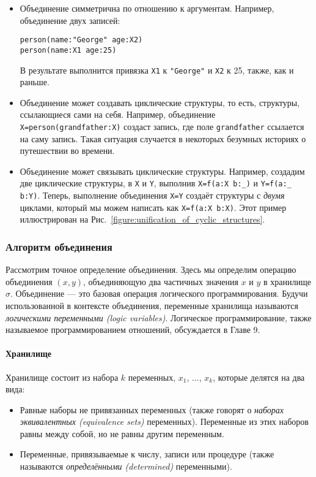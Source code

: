 \begin{itemize}
\item{Объединение симметрична по отношению к аргументам. Например, объединение двух записей:

  \begin{lstlisting}
person(name:"George" age:X2)
person(name:X1 age:25)
  \end{lstlisting}
  
В результате выполнится привязка \lstinline!X1! к \lstinline!"George"! и \lstinline!X2! к 25, также, как и раньше.}

\item{Объединение может создавать циклические структуры, то есть, структуры, ссылающиеся сами на себя. Например, объединение \lstinline!X=person(grandfather:X)! создаст запись, где поле \lstinline!grandfather! ссылается на саму запись. Такая ситуация случается в некоторых безумных историях о путешествии во времени.}

\item{Объединение может связывать циклические структуры. Например, создадим две циклические структуры, в \lstinline!X! и \lstinline!Y!, выполнив \lstinline!X=f(a:X b:_)! и \lstinline!Y=f(a:_ b:Y)!. Теперь, выполнение объединения \lstinline!X=Y! создаёт структуры с \emph{двумя} циклами, который мы можем написать как \lstinline!X=f(a:X b:X)!. Этот пример иллюстрирован на Рис.~\ref{figure:unification_of_cyclic_structures}.}
\end{itemize}

\subsubsection{Алгоритм объединения}

Рассмотрим точное определение объединения. Здесь мы определим операцию объединения $(x, y)$, объединяющую два частичных значения $x$ и $y$ в хранилище $\sigma$. Объединение --- это базовая операция логического программирования. Будучи использованной в контексте объединения, переменные хранилища называются \emph{логическими переменными (logic variables)}. Логическое программирование, также называемое программированием отношений, обсуждается в Главе 9.

\paragraph{Хранилище}

Хранилище состоит из набора $k$ переменных, $x_1$, ..., $x_k$, которые делятся на два вида:

\begin{itemize}

  \item{Равные наборы не привязанных переменных (также говорят о \emph{наборах эквивалентных (equivalence sets)} переменных). Переменные из этих наборов равны между собой, но не равны другим переменным.}

  \item{Переменные, привязываемые к числу, записи или процедуре (также называются \emph{определёнными (determined)} переменными).}
    
\end{itemize}

